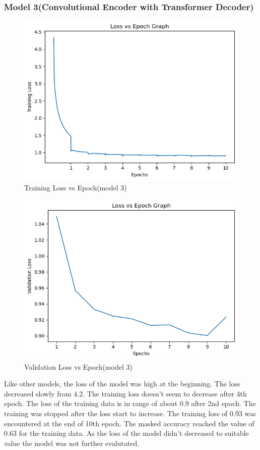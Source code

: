 \subsubsection{Model 3(Convolutional Encoder with Transformer Decoder)}
\begin{figure}[H]
    \includegraphics[scale=.8]{images/tl3.png}
    \caption{Training Loss vs Epoch(model 3)}
    \label{fig:tl3}
\end{figure}
\begin{figure}[H]
    \includegraphics[scale=.8]{images/vl3.png}
    \caption{Validation Loss vs Epoch(model 3)}
    \label{fig:vl3}
\end{figure}
Like other models, the loss of the model was high at the beginning. The loss decreased slowly from 4.2. The training loss doesn’t seem to decrease after 4th epoch. The loss of the training data is in range of about 0.9 after 2nd epoch. The training was stopped after the loss start to increase. The training loss of 0.93 was encountered at the end of 10th epoch. The masked accuracy reached the value of 0.63 for the training data. As the loss of the model didn’t decreased to suitable value the model was not further evalutated.
